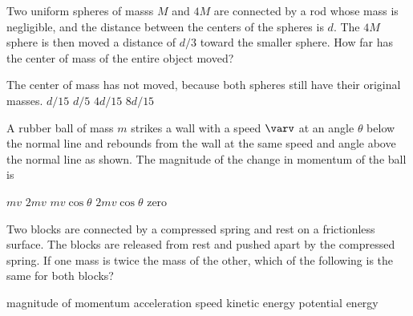\documentclass{../../../oss-classkick-exam}
\begin{document}
\begin{multicols*}{2}
\begin{questions}
    \question Two uniform spheres of masss $M$ and $4M$ are connected by a rod
    whose mass is negligible, and the distance between the centers of the
    spheres is $d$. The $4M$ sphere is then moved a distance of $d/3$ toward the
    smaller sphere. How far has the center of mass of the entire object moved?
    \begin{choices}
      \choice The center of mass has not moved, because both spheres still have
      their original masses.
      \choice $d/15$
      \choice $d/5$
      \correctchoice $4d/15$
      \choice $8d/15$
    \end{choices}
     
    \question A rubber ball of mass $m$ strikes a wall with a speed $\varv$ at
    an angle $\theta$ below the normal line and rebounds from the wall at the
    same speed and angle above the normal line as shown. The magnitude of the
    change in momentum of the ball is
    \begin{center}
    \end{center}
    \begin{choices}
      \choice $mv$
      \choice $2mv$
      \choice $mv\cos\theta$
      \choice $2mv\cos\theta$
      \choice  zero
    \end{choices}
    
    \question Two blocks are connected by a compressed spring and rest on a
    frictionless surface. The blocks are released from rest and pushed apart
    by the compressed spring. If one mass is twice the mass of the other,
    which of the following is the same for both blocks?
    \begin{choices}
      \choice magnitude of momentum
      \choice acceleration
      \choice speed
      \choice kinetic energy
      \choice potential energy
    \end{choices}
    \vspace{.15in}
    

\end{questions}
\end{multicols*}
\end{document}
